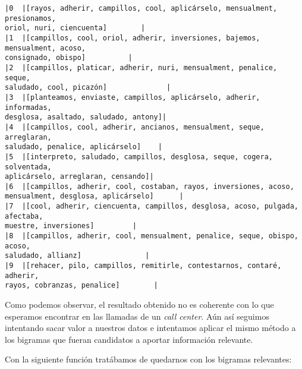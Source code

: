     \begin{Verbatim}[commandchars=\\\{\}]
|0  |[rayos, adherir, campillos, cool, aplicárselo, mensualment, presionamos,
oriol, nuri, ciencuenta]        |
|1  |[campillos, cool, oriol, adherir, inversiones, bajemos, mensualment, acoso,
consignado, obispo]          |
|2  |[campillos, platicar, adherir, nuri, mensualment, penalice, seque,
saludado, cool, picazón]              |
|3  |[planteamos, enviaste, campillos, aplicárselo, adherir, informadas,
desglosa, asaltado, saludado, antony]|
|4  |[campillos, cool, adherir, ancianos, mensualment, seque, arreglaran,
saludado, penalice, aplicárselo]    |
|5  |[interpreto, saludado, campillos, desglosa, seque, cogera, solventada,
aplicárselo, arreglaran, censando]|
|6  |[campillos, adherir, cool, costaban, rayos, inversiones, acoso,
mensualment, desglosa, aplicárselo]      |
|7  |[cool, adherir, ciencuenta, campillos, desglosa, acoso, pulgada, afectaba,
muestre, inversiones]         |
|8  |[campillos, adherir, cool, mensualment, penalice, seque, obispo, acoso,
saludado, allianz]               |
|9  |[rehacer, pilo, campillos, remitirle, contestarnos, contaré, adherir,
rayos, cobranzas, penalice]        |

    \end{Verbatim}

Como podemos observar, el resultado obtenido no es coherente con lo que esperamos encontrar en las llamadas de un \textit{call center}. Aún así seguimos intentando sacar valor a nuestros datos e intentamos aplicar el mismo método a los bigramas que fueran candidatos a aportar información relevante. 

Con la siguiente función tratábamos de quedarnos con los bigramas relevantes: 
\vspace{0.5cm}

